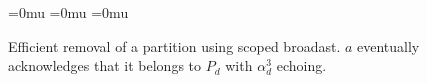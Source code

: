 
\begin{figure}[t]
  \newcommand{\SCALE}{0.8}

  \newcommand\X{42pt}
  \newcommand\Y{-40pt}

  \thickmuskip=0mu
  \medmuskip=0mu
  \thinmuskip=0mu

  \newcommand\ADD{\alpha}
  \newcommand\DEL{\delta}
    
  \newcommand{\LEFT}{\triangleleft}
  \newcommand{\RIGHT}{\triangleright}
  
  \begin{center}
    \hspace{3pt}
  \end{center}
  \caption{\label{fig:del}Efficient removal of a partition using
    scoped broadast. $a$ eventually acknowledges that it belongs to $P_d$ with $\alpha_d^3$ echoing.}
\end{figure}



